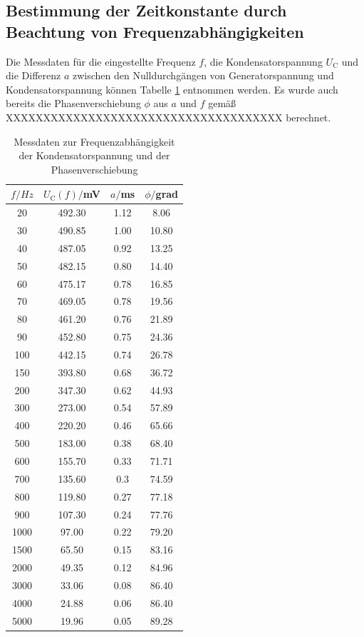 \subsection{Bestimmung der Zeitkonstante durch Beachtung von Frequenzabhängigkeiten}

Die Messdaten für die eingestellte Frequenz $f$, die Kondensatorspannung
$U_\text{C}$ und die Differenz $a$ zwischen den Nulldurchgängen von Generatorspannung
und Kondensatorspannung können Tabelle \ref{tab:frequenzen} entnommen werden. Es wurde auch bereits
die Phasenverschiebung $\phi$ aus $a$ und $f$ gemäß XXXXXXXXXXXXXXXXXXXXXXXXXXXXXXXXXXXXX berechnet.

\begin{table}
\centering
\caption{Messdaten zur Frequenzabhängigkeit der Kondensatorspannung und der Phasenverschiebung}
\label{tab:frequenzen}
\begin{tabular}{c c c c}
\toprule
$f/Hz$ & $U_\text{C}(f)/$mV & $a/$ms & $\phi/$grad\\
\midrule
  20	&  492.30  &  1.12  &   8.06 \\
  30	&  490.85  &  1.00  &  10.80 \\
  40	&  487.05  &  0.92  &  13.25 \\
  50	&  482.15  &  0.80  &  14.40 \\
  60	&  475.17  &  0.78  &  16.85 \\
  70	&  469.05  &  0.78  &  19.56 \\
  80	&  461.20  &  0.76  &  21.89 \\
  90	&  452.80  &  0.75  &  24.36 \\
 100	&  442.15  &  0.74  &  26.78 \\
 150	&  393.80  &  0.68  &  36.72 \\
 200	&  347.30  &  0.62  &  44.93 \\
 300	&  273.00  &  0.54  &  57.89 \\
 400	&  220.20  &  0.46  &  65.66 \\
 500	&  183.00  &  0.38  &  68.40 \\
 600	&  155.70  &  0.33  &  71.71 \\
 700	&  135.60  &  0.3   &  74.59 \\
 800	&  119.80  &  0.27  &  77.18 \\
 900	&  107.30  &  0.24  &  77.76 \\
1000	&   97.00  &  0.22  &  79.20 \\
1500	&   65.50  &  0.15  &  83.16 \\
2000	&   49.35  &  0.12  &  84.96 \\
3000	&   33.06  &  0.08  &  86.40 \\
4000	&   24.88  &  0.06  &  86.40 \\
5000	&   19.96  &  0.05  &  89.28 \\
\bottomrule
\end{tabular}
\end{table}

